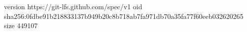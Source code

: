 version https://git-lfs.github.com/spec/v1
oid sha256:0fdbe91b218833137b949b20c8b718ab7fa971db70a35fa77f60eeb032620265
size 449107
